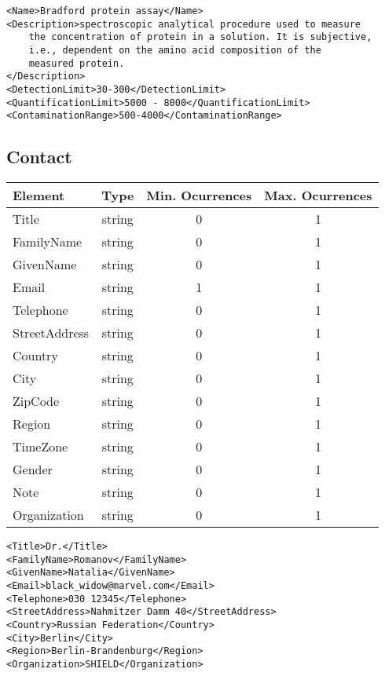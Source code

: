 \documentclass[a4paper]{report}
\begin{document}
\begin{lstlisting}[caption={Example of Assay}, language=RAKIP]
<Name>Bradford protein assay</Name>
<Description>spectroscopic analytical procedure used to measure
    the concentration of protein in a solution. It is subjective,
    i.e., dependent on the amino acid composition of the
    measured protein.
</Description>
<DetectionLimit>30-300</DetectionLimit>
<QuantificationLimit>5000 - 8000</QuantificationLimit>
<ContaminationRange>500-4000</ContaminationRange>
\end{lstlisting}

\subsection{Contact}

\begin{tabular}{|l|c|c|c|}
    \hline
    \textbf{Element} & \textbf{Type} & \textbf{Min. Ocurrences} & \textbf{Max. Ocurrences} \\
    \hline
    Title & string & 0 & 1 \\
    FamilyName & string & 0 & 1 \\
    GivenName & string & 0 & 1 \\
    Email & string & 1 & 1 \\
    Telephone & string & 0 & 1 \\
    StreetAddress & string & 0 & 1\\
    Country & string & 0 & 1 \\
    City & string & 0 & 1 \\
    ZipCode & string & 0 & 1 \\
    Region & string & 0 & 1 \\
    TimeZone & string & 0 & 1 \\
    Gender & string & 0 & 1 \\
    Note & string & 0 & 1 \\
    Organization & string & 0 & 1 \\
    \hline
\end{tabular}

\begin{lstlisting}[language=RAKIP, caption={Example of Contact}]
<Title>Dr.</Title>
<FamilyName>Romanov</FamilyName>
<GivenName>Natalia</GivenName>
<Email>black_widow@marvel.com</Email>
<Telephone>030 12345</Telephone>
<StreetAddress>Nahmitzer Damm 40</StreetAddress>
<Country>Russian Federation</Country>
<City>Berlin</City>
<Region>Berlin-Brandenburg</Region>
<Organization>SHIELD</Organization>
\end{lstlisting}
\end{document}
